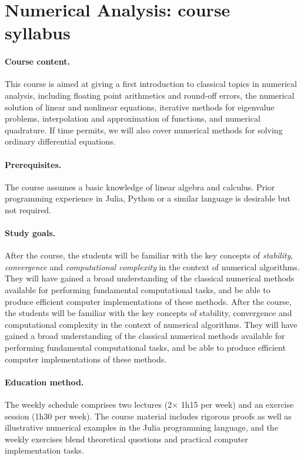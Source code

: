\documentclass[a4paper,11pt]{article}
\begin{document}
\section*{Numerical Analysis: course syllabus}%

\paragraph{Course content.}%
This course is aimed at giving a first introduction to classical topics in numerical analysis,
including floating point arithmetics and round-off errors,
the numerical solution of linear and nonlinear equations,
iterative methods for eigenvalue problems,
interpolation and approximation of functions,
and numerical quadrature.
If time permits, we will also cover numerical methods for solving ordinary differential equations.

\paragraph{Prerequisites.}%
The course assumes a basic knowledge of linear algebra and calculus.
Prior programming experience in Julia, Python or a similar language is desirable but not required.

\paragraph{Study goals.}%
After the course,
the students will be familiar with the key concepts of \emph{stability}, \emph{convergence} and \emph{computational complexity} in the context of numerical algorithms.
They will have gained a broad understanding of the classical numerical methods available for performing fundamental computational tasks,
and be able to produce efficient computer implementations of these methods.
After the course, the students will be familiar with the key concepts of stability, convergence and computational complexity in the context of numerical algorithms. They will have gained a broad understanding of the classical numerical methods available for performing fundamental computational tasks, and be able to produce efficient computer implementations of these methods.

\paragraph{Education method.}%
The weekly schedule comprises two lectures (2$\times$ 1h15 per week) and an exercise session (1h30 per week).
The course material includes rigorous proofs as well as illustrative numerical examples in the Julia programming language,
and the weekly exercises blend theoretical questions and practical computer implementation tasks.
\end{document}

